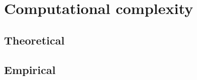 \documentclass{article}
\begin{document}


%     



\section{Computational complexity}
\subsection{Theoretical}

\subsection{Empirical}
\end{document}

